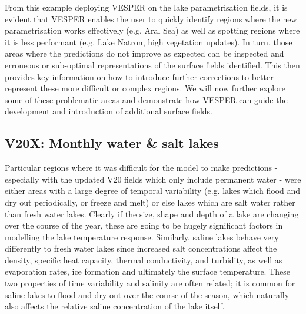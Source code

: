 \documentclass[twocolumn]{article}
\begin{document}
	\noindent From this example deploying VESPER on the lake parametrisation fields, it is evident that VESPER enables the user to quickly identify regions where the new parametrisation works effectively (e.g. Aral Sea) as well as spotting regions where it is less performant (e.g. Lake Natron, high vegetation updates). In turn, those areas where the predictions do not improve as expected can be inspected and erroneous or sub-optimal representations of the surface fields identified. This then provides key information on how to introduce further corrections to better represent these more difficult or complex regions. We will now further explore some of these problematic areas and demonstrate how VESPER can guide the development and introduction of additional surface fields.
	
	
	
	\subsection{V20X: Monthly water \& salt lakes}
	\noindent Particular regions where it was difficult for the model to make predictions - especially with the updated V20 fields which only include permanent water - were either areas with a large degree of temporal variability (e.g. lakes which flood and dry out periodically, or freeze and melt) or else lakes which are salt water rather than fresh water lakes. Clearly if the size, shape and depth of a lake are changing over the course of the year, these are going to be hugely significant factors in modelling the lake temperature response. Similarly, saline lakes behave very differently to fresh water lakes since increased salt concentrations affect the density, specific heat capacity, thermal conductivity, and turbidity, as well as evaporation rates, ice formation and ultimately the surface temperature. These two properties of time variability and salinity are often related; it is common for saline lakes to flood and dry out over the course of the season, which naturally also affects the relative saline concentration of the lake itself.  \newline 
	
\end{document}
